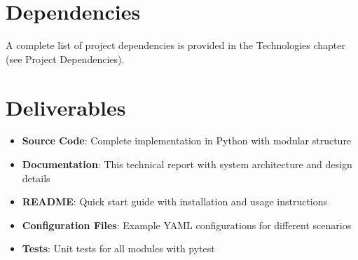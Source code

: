 \section{Dependencies}

A complete list of project dependencies is provided in the Technologies chapter (see Project Dependencies).

\section{Deliverables}

\begin{itemize}
    \item \textbf{Source Code}: Complete implementation in Python with modular structure
    \item \textbf{Documentation}: This technical report with system architecture and design details
    \item \textbf{README}: Quick start guide with installation and usage instructions
    \item \textbf{Configuration Files}: Example YAML configurations for different scenarios
    \item \textbf{Tests}: Unit tests for all modules with pytest
\end{itemize}